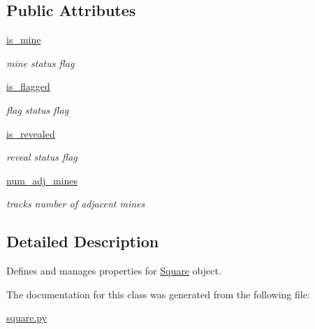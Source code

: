 \subsection*{Public Attributes}
\begin{DoxyCompactItemize}
\item 
\mbox{\label{classsquare_1_1_square_ad2062d3ce87e13025e87dee4e1b85d91}} 
\mbox{\hyperlink{classsquare_1_1_square_ad2062d3ce87e13025e87dee4e1b85d91}{is\+\_\+mine}}
\begin{DoxyCompactList}\small\item\em mine status flag \end{DoxyCompactList}\item 
\mbox{\label{classsquare_1_1_square_a8684629ca55e92a8eab33cab2a109f5e}} 
\mbox{\hyperlink{classsquare_1_1_square_a8684629ca55e92a8eab33cab2a109f5e}{is\+\_\+flagged}}
\begin{DoxyCompactList}\small\item\em flag status flag \end{DoxyCompactList}\item 
\mbox{\label{classsquare_1_1_square_a92711a6d16ffabcb604c324ad639ace8}} 
\mbox{\hyperlink{classsquare_1_1_square_a92711a6d16ffabcb604c324ad639ace8}{is\+\_\+revealed}}
\begin{DoxyCompactList}\small\item\em reveal status flag \end{DoxyCompactList}\item 
\mbox{\label{classsquare_1_1_square_a8fa87301ffc57ce8068f01df1c5c833b}} 
\mbox{\hyperlink{classsquare_1_1_square_a8fa87301ffc57ce8068f01df1c5c833b}{num\+\_\+adj\+\_\+mines}}
\begin{DoxyCompactList}\small\item\em tracks number of adjacent mines \end{DoxyCompactList}\end{DoxyCompactItemize}


\subsection{Detailed Description}
Defines and manages properties for \mbox{\hyperlink{classsquare_1_1_square}{Square}} object. 

The documentation for this class was generated from the following file\+:\begin{DoxyCompactItemize}
\item 
\mbox{\hyperlink{square_8py}{square.\+py}}\end{DoxyCompactItemize}
